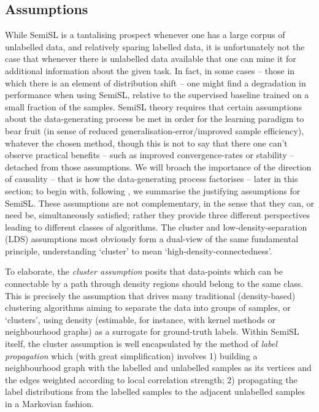 \subsection{Assumptions}\label{ssec:assumptions}
While SemiSL is a tantalising prospect whenever one has a large corpus of unlabelled data, and
relatively sparing labelled data, it is unfortunately not the case that whenever there is
unlabelled data available that one can mine it for additional information about the given task. 
%
In fact, in some cases -- those in which there is an element of distribution shift -- one might
find a degradation in performance when using SemiSL, relative to the supervised baseline trained on
a small fraction of the samples.
%
SemiSL theory requires that certain assumptions about the data-generating process be met in order
for the learning paradigm to bear fruit (in sense of reduced generalisation-error/improved sample
efficiency), whatever the chosen method, though this is not to say that there one can't observe
practical benefits -- such as improved convergence-rates or stability -- detached from those
assumptions.
%
We will broach the importance of the direction of causality -- that is how the data-generating
process factorises -- later in this section; to begin with, following \citep{chapelle2009semi}, we
summarise the justifying assumptions for SemiSL.
%
These assumptions are not complementary, in the sense that they can, or need be, simultaneously
satisfied; rather they provide three different perspectives leading to different classes of
algorithms. 
%
The cluster and low-density-separation (LDS) assumptions most obviously form a dual-view of the same
fundamental principle, understanding `cluster' to mean `high-density-connectedness'.
%


%
To elaborate, the \emph{cluster assumption} posits that data-points which can be connectable by a
path through density regions should belong to the same class.
%
This is precisely the assumption that drives many traditional (density-based) clustering algorithms
aiming to separate the data into groups of samples, or `clusters', using density (estimable, for
instance, with kernel methods or neighbourhood graphs) as a surrogate for ground-truth labels.
%
Within SemiSL itself, the cluster assumption is well encapsulated by the method of \emph{label
propagation} \citep{szummer2001partially} which (with great simplification) involves 1) building a
neighbourhood graph with the labelled and unlabelled samples as its vertices and the edges weighted
according to local correlation strength; 2) propagating the label distributions from the labelled
samples to the adjacent unlabelled samples in a Markovian fashion.
%

